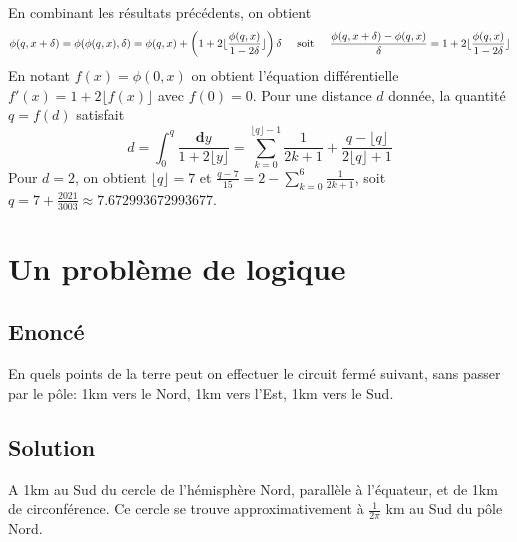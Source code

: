 \documentclass{article}
\begin{document}
En combinant les résultats précédents, on obtient
\[
\phi(q,x+\delta)=\phi(\phi(q,x),\delta)=\phi(q,x)+\left(1+2\lfloor\frac{\phi(q,x)}{1-2\delta}\rfloor\right)\delta
\hspace{.5cm}\textrm{soit}\hspace{.5cm}
\frac{\phi(q,x+\delta)-\phi(q,x)}{\delta}=1+2\lfloor\frac{\phi(q,x)}{1-2\delta}\rfloor
\]
En notant $f(x)=\phi(0,x)$ on obtient l'équation différentielle $f'(x)=1+2\lfloor f(x)\rfloor$ avec $f(0)=0$. Pour une distance $d$ donnée, la quantité $q=f(d)$ satisfait
\[
d = \int_0^q\frac{\mathbf{d}y}{1+2\lfloor y\rfloor} =
\sum_{k=0}^{\lfloor q\rfloor-1}\frac{1}{2k+1}+\frac{q-\lfloor q\rfloor}{2\lfloor q\rfloor+1}
\]
Pour $d=2$, on obtient $\lfloor q\rfloor=7$ et $\frac{q-7}{15}=2-\sum_{k=0}^{6}\frac{1}{2k+1}$, soit $q=7+\frac{2021}{3003}\approx7.672993672993677$.
\pagebreak

\section{Un problème de logique}

\subsection{Enoncé}
En quels points de la terre peut on effectuer le circuit fermé suivant, sans passer par le pôle: 1km vers le Nord, 1km vers l'Est, 1km vers le Sud.
\subsection{Solution}
A 1km au Sud du cercle de l'hémisphère Nord, parallèle à l'équateur, et de 1km de circonférence. Ce cercle se trouve approximativement à $\frac{1}{2\pi}$ km au Sud du pôle Nord.
\pagebreak
\end{document}
